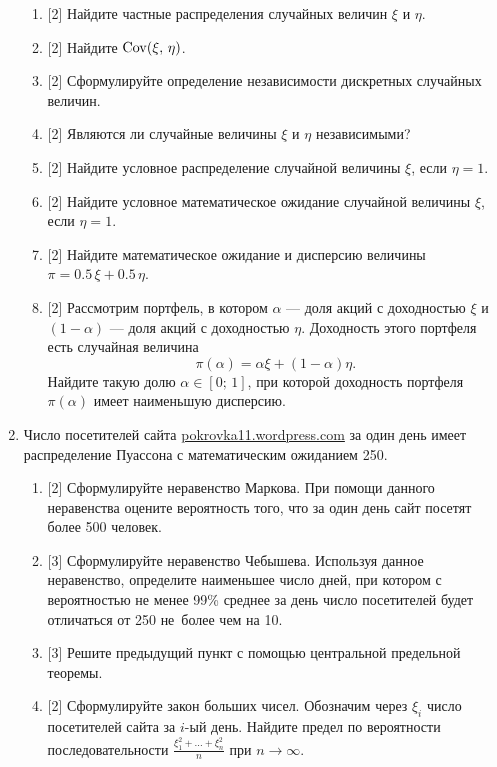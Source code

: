 \documentclass[12pt, a4paper]{article}\usepackage[]{graphicx}\usepackage[]{color}
\begin{document}
\begin{enumerate}
							\begin{enumerate}
								\item{} [2] Найдите частные распределения случайных величин $\xi$ и $\eta$.
								\item{} [2] Найдите $\operatorname{Cov}(\xi,\,\eta)$.
								\item{} [2] Сформулируйте определение независимости дискретных случайных величин.
								\item{} [2] Являются ли случайные величины $\xi$ и $\eta$ независимыми?
								\item{} [2] Найдите условное распределение случайной величины $\xi$, если $\eta = 1$.
								\item{} [2] Найдите условное математическое ожидание случайной величины $\xi$, если $\eta = 1$.
								\item{} [2] Найдите математическое ожидание и дисперсию величины $\pi = 0.5\, \xi + 0.5\, \eta$.
								\item{} [2] Рассмотрим портфель, в котором $\alpha$ — доля акций с доходностью $\xi$ и $(1 - \alpha)$ — доля акций с доходностью $\eta$. Доходность этого портфеля есть случайная величина
								\[\pi(\alpha) = \alpha \xi + (1-\alpha)\eta.\]
								Найдите такую долю $\alpha \in [0;\,1]$, при которой доходность портфеля $\pi(\alpha)$ имеет наименьшую дисперсию.
							\end{enumerate}

							\newpage
							\item Число посетителей сайта \url{pokrovka11.wordpress.com} за один день имеет распределение Пуассона с математическим ожиданием 250.
							\begin{enumerate}
								\item{} [2] Сформулируйте неравенство Маркова. При помощи данного неравенства оцените вероятность того, что за один день сайт посетят более 500 человек.
								\item{} [3] Сформулируйте неравенство Чебышева. Используя данное неравенство, определите наименьшее число дней, при котором с вероятностью не менее 99\% среднее за день число посетителей будет отличаться от 250 не~более чем на 10.
								\item{} [3] Решите предыдущий пункт с помощью центральной предельной теоремы.
								\item{} [2] Сформулируйте закон больших чисел. Обозначим через $\xi_i$ число посетителей сайта за $i$-ый день. Найдите предел по вероятности последовательности $\frac{\xi_1^2 + \ldots + \xi_n^2}{n}$ при $n \rightarrow \infty$.
							\end{enumerate}


\end{enumerate}
\end{document}
